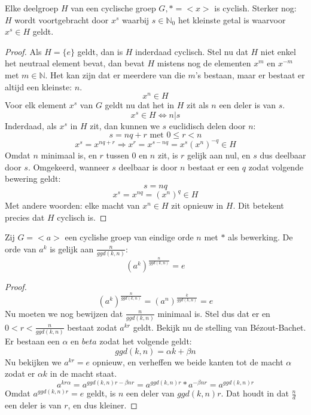 \documentclass[main.tex]{subfiles}
\begin{document}
\begin{st}
  \label{st:deelgroep-van-cyclische-groep-is-cyclisch}
  Elke deelgroep $H$ van een cyclische groep $G,* = <x>$ is cyclish.
  Sterker nog: $H$ wordt voortgebracht door $x^{s}$ waarbij $s \in \mathbb{N}_{0 }$ het kleinste getal is waarvoor $x^{s} \in H$ geldt. 

  \begin{proof}
    Als $H = \{e\}$ geldt, dan is $H$ inderdaad cyclisch.
    Stel nu dat $H$ niet enkel het neutraal element bevat, dan bevat $H$ mistens nog de elementen $x^{m}$ en $x^{-m}$ met $m \in \mathbb{N}$.
    Het kan zijn dat er meerdere van die $m$'s bestaan, maar er bestaat er altijd een kleinste: $n$.
    \[ x^{n} \in H \]
    Voor elk element $x^{s}$ van $G$ geldt nu dat het in $H$ zit als $n$ een deler is van $s$.
    \[ x^{s} \in H \Leftrightarrow n|s \]
    Inderdaad, als $x^{s}$ in $H$ zit, dan kunnen we $s$ euclidisch delen door $n$:
    \[ s = nq + r \text{ met } 0 \le r < n \]
    \[ x^{s} = x^{nq + r} \Rightarrow x^{r} = x^{s-nq} = x^{s}(x^{n})^{-q} \in H \]
    Omdat $n$ minimaal is, en $r$ tussen $0$ en $n$ zit, is $r$ gelijk aan nul, en $s$ dus deelbaar door $s$.
    Omgekeerd, wanneer $s$ deelbaar is door $n$ bestaat er een $q$ zodat volgende bewering geldt:
    \[ s = nq \]
    \[ x^{s} = x^{nq} = (x^{n})^{q} \in H \]
    Met andere woorden: elke macht van $x^{n} \in H$ zit opnieuw in $H$. Dit betekent precies dat $H$ cyclisch is.
  \end{proof}
\end{st}

\begin{st}
  \label{st:orde-element-cyclische-groep}
  Zij $G = <a>$ een cyclishe groep van eindige orde $n$ met $*$ als bewerking.
  De orde van $a^{k}$ is gelijk aan $\frac{n}{ggd(k,n)}$:
  \[ (a^{k})^{\frac{n}{ggd(k,n)}} = e\]
  
  \begin{proof}
    \[ (a^{k})^{\frac{n}{ggd(k,n)}} = (a^{n})^{\frac{k}{ggd(k,n)}} = e \]
    Nu moeten we nog bewijzen dat $\frac{n}{ggd(k,n)}$ minimaal is.
    Stel dus dat er en $0 < r < \frac{n}{ggd(k,n)}$ bestaat zodat $a^{kr}$ geldt.
    Bekijk nu de stelling van B\'ezout-Bachet.
    Er bestaan een $\alpha$ en $beta$ zodat het volgende geldt:
    \[ ggd(k,n) = \alpha k + \beta n \]
    Nu bekijken we $a^{kr} = e$ opnieuw, en verheffen we beide kanten tot de macht $\alpha$ zodat er $\alpha k$ in de macht staat.
    \[ a^{kr\alpha} = a^{ggd(k,n)r - \beta nr} = a^{ggd(k,n)r}* a^{-\beta nr} = a^{ggd(k,n)r}\]
    Omdat $a^{ggd(k,n)r} = e$ geldt, is $n$ een deler van $ggd(k,n)r$.
    Dat houdt in dat $\frac{n}{d}$ een deler is van $r$, en dus kleiner.
  \end{proof}

\end{st}
\end{document}
